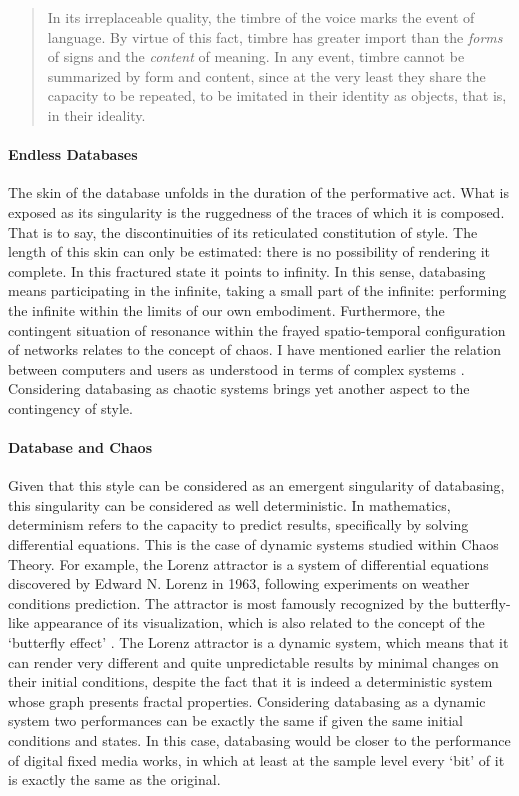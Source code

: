 \begin{quote}
	In its irreplaceable quality, the timbre of the voice marks the event of language. By virtue of this fact, timbre has greater import than the \textit{forms} of signs and the \textit{content} of meaning. In any event, timbre cannot be summarized by form and content, since at the very least they share the capacity to be repeated, to be imitated in their identity as objects, that is, in their ideality. \parencite[296]{Der82:Mar}
\end{quote}

\paragraph{Endless Databases}
The skin of the database unfolds in the duration of the performative act. What is exposed as its singularity is the ruggedness of the traces of which it is composed. That is to say, the discontinuities of its reticulated constitution of style. The length of this skin can only be estimated: there is no possibility of rendering it complete. In this fractured state it points to infinity. In this sense, databasing means participating in the infinite, taking a small part of the infinite: performing the infinite within the limits of our own embodiment. Furthermore, the contingent situation of resonance within the frayed spatio-temporal configuration of networks relates to the concept of chaos. I have mentioned earlier the relation between computers and users as understood in terms of complex systems . Considering databasing as chaotic systems brings yet another aspect to the contingency of style. 

\paragraph{Database and Chaos}
Given that this style can be considered as an emergent singularity of databasing, this singularity can be considered as well deterministic. In mathematics, determinism refers to the capacity to predict results, specifically by solving differential equations. This is the case of dynamic systems studied within Chaos Theory. For example, the Lorenz attractor is a system of differential equations discovered by Edward N. Lorenz in 1963, following experiments on weather conditions prediction. The attractor is most famously recognized by the butterfly-like appearance of its visualization, which is also related to the concept of the `butterfly effect' . The Lorenz attractor is a dynamic system, which means that it can render very different and quite unpredictable results by minimal changes on their initial conditions, despite the fact that it is indeed a deterministic system whose graph presents fractal properties. Considering databasing as a dynamic system two performances can be exactly the same if given the same initial conditions and states. In this case, databasing would be closer to the performance of digital fixed media works, in which at least at the sample level every `bit' of it is exactly the same as the original. 

